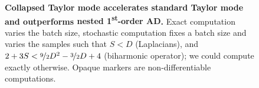 \begin{figure}[!t]
  \caption{\textbf{\textcolor{tab-green}{Collapsed Taylor mode} accelerates \textcolor{tab-orange}{standard Taylor mode} and outperforms \textcolor{tab-blue}{nested 1\textsuperscript{st}-order AD}.}
    Exact computation varies the batch size, stochastic computation fixes a batch size and varies the samples such that $S < D$ (Laplacians), and $2 + 3S < \nicefrac{9}{2} D^2 - \nicefrac{3}{2}D + 4$ (biharmonic operator); we could compute exactly otherwise.
    Opaque markers are non-differentiable computations.
  }
  \label{fig:benchmark}
\end{figure}
